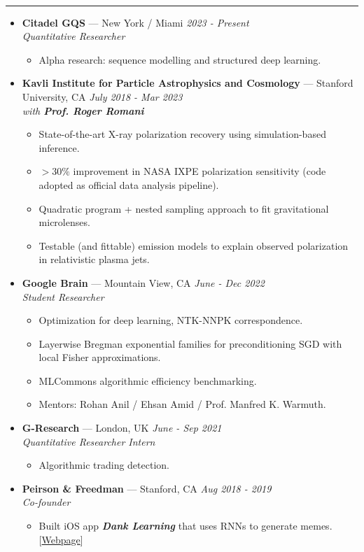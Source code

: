 \documentclass[11pt, oneside]{article}
\newenvironment{ressection}[1]{
	\vspace{4pt}
	{\selectfont\Large\color{Mycolor2}{\textbf{#1}}}
	\vspace{-6.5pt} \\
	\textcolor{Mycolor2}{\rule{\textwidth}{0.7pt}}
	\begin{itemize}
	\vspace{3pt}
}{
	\end{itemize}
}
\newcommand{\ressubitem}{
	\vspace{-4pt}
	\item
}
\newcommand{\resbigitem}[3]{
	\vspace{-5pt}
	\item[]
	\textbf{#1} --- #2 %
	\hfill
	\textit{#3}
}
\newenvironment{ressubsec}[3]{
	\resbigitem{#1}{#2}{#3}
	\vspace{-2pt}
	\begin{itemize}
}{
	\end{itemize}
}
\begin{document}
\begin{ressection}{\textbf{Experience}}

\vspace{2pt}
\begin{ressubsec}{Citadel GQS}{New York / Miami}{2023 - Present  \\ Quantitative Researcher}
	\ressubitem{Alpha research: sequence modelling and structured deep learning.}
\end{ressubsec}

\vspace{2pt}
\begin{ressubsec}{Kavli Institute for Particle Astrophysics and Cosmology}{Stanford University, CA}{July 2018 - Mar 2023 \\ with \textbf{Prof. Roger Romani}}
\ressubitem{State-of-the-art X-ray polarization recovery using simulation-based inference.}
\ressubitem{$>30\%$ improvement in NASA IXPE polarization sensitivity (code adopted as official data analysis pipeline).}
\ressubitem{Quadratic program + nested sampling approach to fit gravitational microlenses.}
		\ressubitem{Testable (and fittable) emission models to explain observed polarization in relativistic plasma jets.}
	\end{ressubsec}

\vspace{2pt}
\begin{ressubsec}{Google Brain}{Mountain View, CA}{June - Dec 2022  \\ Student Researcher}
	\ressubitem{Optimization for deep learning, NTK-NNPK correspondence.}
	\ressubitem{Layerwise Bregman exponential families for preconditioning SGD with local Fisher approximations.}
	\ressubitem{MLCommons algorithmic efficiency benchmarking.}
	\ressubitem{Mentors: Rohan Anil / Ehsan Amid / Prof. Manfred K. Warmuth.}
\end{ressubsec}

\vspace{2pt}
\begin{ressubsec}{G-Research}{London, UK}{June - Sep 2021  \\ Quantitative Researcher Intern}
		\ressubitem{Algorithmic trading detection.}
	\end{ressubsec}

\vspace{2pt}
\begin{ressubsec}{Peirson \& Freedman}{Stanford, CA}{Aug 2018 - 2019  \\ Co-founder}
\ressubitem{Built iOS app \textbf{\emph{Dank Learning}} that uses RNNs to generate memes. [\href{https://danklearning.com/}{Webpage}]}
	\end{ressubsec}


\end{ressection}
\end{document}

